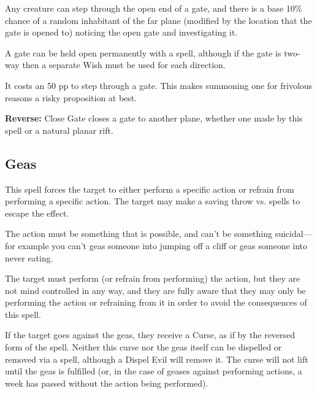 \begin{multicols*}{2}
Any creature can step through the open end of a gate, and there is a base 10\% chance of a random inhabitant of the far plane (modified by the location that the gate is opened to) noticing the open gate and investigating it.

A gate can be held open permanently with a  spell, although if the gate is two-way then a separate Wish must be used for each direction.

It costs an  50 pp to step through a gate. This makes summoning one for frivolous reasons a risky proposition at best.

\textbf{Reverse:} \hypertarget{spell:Close Gate}{Close Gate} closes a gate to another plane, whether one made by this spell or a natural planar rift.

\subsection{Geas}\label{spell:Geas}

This spell forces the target to either perform a specific action or refrain from performing a specific action. The target may make a saving throw vs. spells to escape the effect.

The action must be something that is possible, and can’t be something suicidal—for example you can’t geas someone into jumping off a cliff or geas someone into never eating.

The target must perform (or refrain from performing) the action, but they are not mind controlled in any way, and they are fully aware that they may only be performing the action or refraining from it in order to avoid the consequences of this spell.

If the target goes against the geas, they receive a Curse, as if by the reversed form of the  spell. Neither this curse nor the geas itself can be dispelled or removed via a  spell, although a Dispel Evil will remove it. The curse will not lift until the geas is fulfilled (or, in the case of geases against performing actions, a week has passed without the action being performed).


\end{multicols*}
